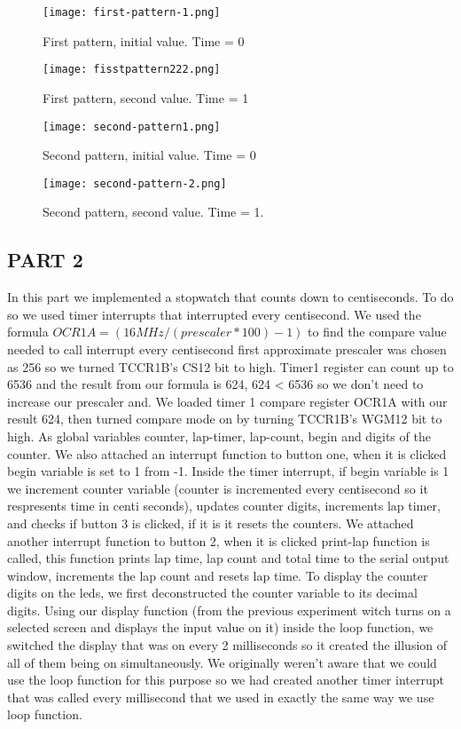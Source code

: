 \documentclass[pdftex,12pt,a4paper]{article}
\begin{document}
\begin{figure}[H]
	\centering
	\texttt{[image: first-pattern-1.png]}	
	\caption{First pattern, initial value. Time = 0}
	\label{fig5}
\end{figure}
\begin{figure}[H]
	\centering
	\texttt{[image: fisstpattern222.png]}	
	\caption{First pattern, second value. Time = 1}
	\label{fig5}
\end{figure}
\begin{figure}[H]
	\centering
	\texttt{[image: second-pattern1.png]}	
	\caption{Second pattern, initial value. Time = 0}
	\label{fig5}
\end{figure}
\begin{figure}[H]
	\centering
	\texttt{[image: second-pattern-2.png]}	
	\caption{Second pattern, second value. Time = 1.}
	\label{fig5}
\end{figure}
 
\subsection{PART 2}
In this part we implemented a stopwatch that counts down to centiseconds. To do so we used timer interrupts that interrupted every centisecond. We used the formula $OCR1A = (16MHz / (prescaler*100) -1)$ to find the compare value needed to call interrupt every centisecond first approximate prescaler was chosen as 256 so we turned TCCR1B's CS12 bit to high. Timer1 register can  count up to 6536 and the result from our formula is 624, 624 < 6536 so we don't need to increase our prescaler and. We loaded timer 1 compare register OCR1A with our result 624, then turned compare mode on by turning  TCCR1B's WGM12 bit to high. As global variables counter, lap-timer, lap-count, begin and digits of the counter. We also attached an interrupt function to button one, when it is clicked begin variable is set to 1 from -1. Inside the timer interrupt, if begin variable is 1 we increment counter variable (counter is incremented every centisecond so it respresents time in centi seconds), updates counter digits, increments lap timer, and checks if button 3 is clicked, if it is it resets the counters. We attached another interrupt function to button 2, when it is clicked print-lap function is called, this function prints lap time, lap count and total time to the serial output window, increments the lap count and resets lap time. To display the counter digits on the leds, we first deconstructed the counter variable to its decimal digits. Using our display function (from the previous experiment witch turns on a selected screen and displays the input value on it) inside the loop function, we switched the display that was on every 2 milliseconds so it created the illusion of all of them being on simultaneously. We originally weren't aware that we could use the loop function for this purpose so we had created another timer interrupt that was called every millisecond that we used in exactly the same way we use loop function. 
\end{document}
